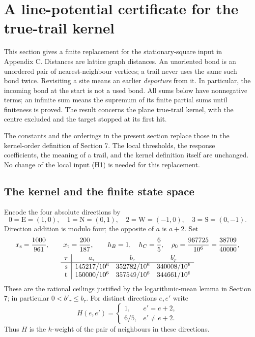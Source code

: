 \section{A line-potential certificate for the true-trail kernel}
\label{sec:h3line}

This section gives a finite replacement for the stationary-square input
in Appendix C.  Distances are lattice graph distances.  An unoriented
bond is an unordered pair of nearest-neighbour vertices; a trail never
uses the same such bond twice.  Revisiting a site means an earlier
\emph{departure} from it.  In particular, the incoming bond at the start
is not a used bond.  All sums below have nonnegative terms; an infinite
sum means the supremum of its finite partial sums until finiteness is
proved.  The result concerns the plane true-trail kernel, with the centre
excluded and the target stopped at its first hit.

The constants and the orderings in the present section replace those in
the kernel-order definition of Section 7.  The local thresholds, the
response coefficients, the meaning of a trail, and the kernel definition
itself are unchanged.  No change of the local input (H1) is needed for
this replacement.

\subsection{The kernel and the finite state space}

Encode the four absolute directions by
\[
 0=\mathrm E=(1,0),\quad 1=\mathrm N=(0,1),\quad
 2=\mathrm W=(-1,0),\quad 3=\mathrm S=(0,-1).
\]
Direction addition is modulo four; the opposite of $a$ is $a+2$.
Set
\begin{equation}\label{hl:constants}
\begin{gathered}
 x_{\rm s}=\frac{1000}{961},\qquad x_{\rm t}=\frac{200}{187},\qquad
 h_B=1,\quad h_C=\frac65,\quad \rho_0=\frac{967725}{10^6}
             =\frac{38709}{40000},\\
\begin{array}{c|ccc}
 \tau&a_\tau&b_\tau&b'_\tau\\\hline
 \mathrm s&145217/10^6&352782/10^6&340008/10^6\\
 \mathrm t&150000/10^6&357549/10^6&344661/10^6
\end{array}
\end{gathered}
\end{equation}
These are the rational ceilings justified by the logarithmic-mean
lemma in Section 7; in particular $0<b'_\tau\le b_\tau$.
For distinct directions $e,e'$ write
\[
 H(e,e')=\begin{cases}1,&e'=e+2,\\6/5,&e'\ne e+2.\end{cases}
\]
Thus $H$ is the $h$-weight of the pair of neighbours in these directions.

